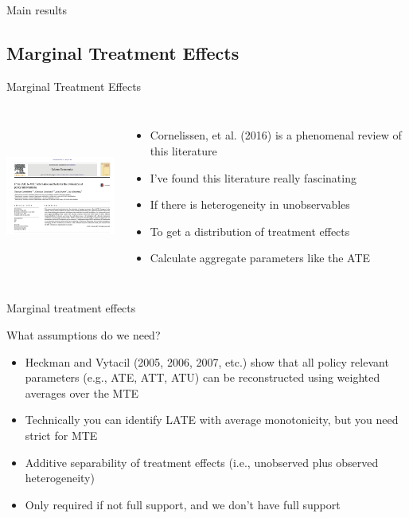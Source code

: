 \documentclass{beamer}
\begin{document}
\begin{frame}[shrink=20]{Main results}

  

\end{frame}


\subsection{Marginal Treatment Effects}


\begin{frame}{Marginal Treatment Effects}
  \begin{columns}
    \centering
    \includegraphics[height=5.25cm, width=4.5cm]{./lecture_includes/labour_mte.png}
    \begin{itemize}
      \item Cornelissen, et al. (2016) is a phenomenal review of this literature
      \item I've found this literature really fascinating
      \item If there is heterogeneity in unobservables
      \item To get a distribution of treatment effects
      \item Calculate aggregate parameters like the ATE
    \end{itemize}
  \end{columns}
\end{frame}





\begin{frame}{Marginal treatment effects}

  What assumptions do we need?
  \begin{itemize}
    \item Heckman and Vytacil (2005, 2006, 2007, etc.) show that all policy relevant parameters (e.g., ATE, ATT, ATU) can be reconstructed using weighted averages over the MTE
    \item Technically you can identify LATE with average monotonicity, but you need strict for MTE
    \item Additive separability of treatment effects (i.e., unobserved plus observed heterogeneity)
    \item Only required if not full support, and we don't have full support
  \end{itemize}

\end{frame}
\end{document}
